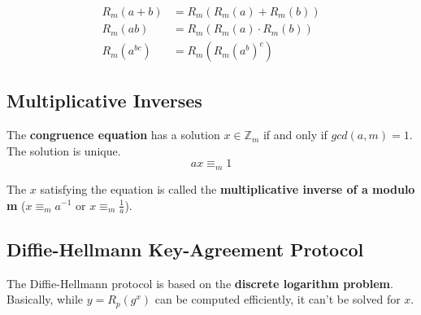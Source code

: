 \documentclass[11pt]{article}
\begin{document}
\begin{equation*}
\begin{split}
	R_m(a + b) & = R_m(R_m(a) + R_m(b)) \\
	R_m(ab) & = R_m(R_m(a) \cdot R_m(b)) \\
	R_m(a^{bc}) & = R_m(R_m(a^b)^c)
\end{split}
\end{equation*}

\subsection{Multiplicative Inverses}

The \textbf{congruence equation} has a solution $x \in \mathbb{Z}_m$ if and only if $gcd(a, m) =1$. The solution is unique.
\begin{equation*}
	ax \equiv_m 1
\end{equation*}

The $x$ satisfying the equation is called the \textbf{multiplicative inverse of a modulo m} ($x \equiv_m a^{-1}$ or $x \equiv_m \frac{1}{a}$).

\subsection{Diffie-Hellmann Key-Agreement Protocol}

The Diffie-Hellmann protocol is based on the \textbf{discrete logarithm problem}. Basically, while $y = R_p(g^x)$ can be computed efficiently, it can't be solved for $x$.
\end{document}
